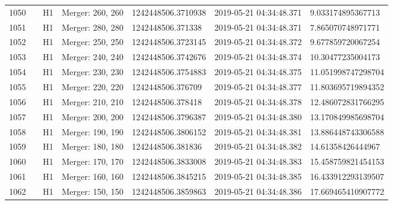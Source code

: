 \begin{longtable}{lllllll}
1050 &                                                    &       H1 &  Merger: 260, 260 &  1242448506.3710938 &  2019-05-21 04:34:48.371 &   9.033174895367713 \\
1051 &                                                    &       H1 &  Merger: 280, 280 &   1242448506.371338 &  2019-05-21 04:34:48.371 &   7.865070748971771 \\
1052 &                                                    &       H1 &  Merger: 250, 250 &  1242448506.3723145 &  2019-05-21 04:34:48.372 &   9.677859720067254 \\
1053 &                                                    &       H1 &  Merger: 240, 240 &  1242448506.3742676 &  2019-05-21 04:34:48.374 &   10.30477235004173 \\
1054 &                                                    &       H1 &  Merger: 230, 230 &  1242448506.3754883 &  2019-05-21 04:34:48.375 &  11.051998747298704 \\
1055 &                                                    &       H1 &  Merger: 220, 220 &   1242448506.376709 &  2019-05-21 04:34:48.377 &  11.803695719894352 \\
1056 &                                                    &       H1 &  Merger: 210, 210 &   1242448506.378418 &  2019-05-21 04:34:48.378 &  12.486072831766295 \\
1057 &                                                    &       H1 &  Merger: 200, 200 &  1242448506.3796387 &  2019-05-21 04:34:48.380 &  13.170849985698704 \\
1058 &                                                    &       H1 &  Merger: 190, 190 &  1242448506.3806152 &  2019-05-21 04:34:48.381 &  13.886448743306588 \\
1059 &                                                    &       H1 &  Merger: 180, 180 &   1242448506.381836 &  2019-05-21 04:34:48.382 &   14.61358426444967 \\
1060 &                                                    &       H1 &  Merger: 170, 170 &  1242448506.3833008 &  2019-05-21 04:34:48.383 &  15.458759821454153 \\
1061 &                                                    &       H1 &  Merger: 160, 160 &  1242448506.3845215 &  2019-05-21 04:34:48.385 &  16.433912293139507 \\
1062 &                                                    &       H1 &  Merger: 150, 150 &  1242448506.3859863 &  2019-05-21 04:34:48.386 &  17.669465410907772 \\

\end{longtable}
